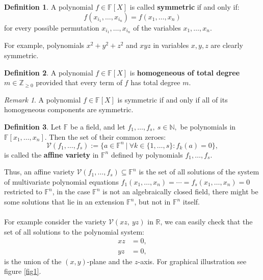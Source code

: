 \documentclass[thesis=M,english]{FITthesis}[2012/10/20]
\theoremstyle{remark}
\newtheorem*{RM}{Remark}
\theoremstyle{definition}
\newtheorem{DF}{Definition}[section]
\begin{document}
\begin{DF}
A polynomial $f \in \mathbb{F}[X]$ is called \textbf{symmetric} if and only if:
$$
f(x_{i_1}, \ldots, x_{i_n}) = f(x_1, \ldots, x_n)
$$
for every possible permutation $x_{i_1}, \ldots, x_{i_n}$ of the variables $x_1, \ldots, x_n$.
\end{DF}
\noindent For example, polynomials $x^2+y^2+z^2$ and $xyz$ in variables $x,y,z$ are clearly symmetric.
\begin{DF}
A polynomial $f \in \mathbb{F}[X]$ is \textbf{homogeneous of total degree} $m \in \mathbb{Z}_{\geq 0}$ provided that every term of $f$ has total degree $m$.
\end{DF}
\begin{RM}
A polynomial $f \in \mathbb{F}[X]$ is symmetric if and only if all of its homogeneous components are symmetric.
\end{RM}
\begin{DF}
Let $\mathbb{F}$ be a field, and let $f_1, \ldots, f_s,\ s \in \mathbb{N},$ be polynomials in $\mathbb{F}[x_1,\ldots, x_n].$ Then the set of their common zeroes:
$$
\mathcal{V}(f_1, \ldots, f_s) := \{a \in \mathbb{F}^n\ |\ \forall k \in \{1,\ldots,s\}: f_k(a) =  0\},
$$
is called the \textbf{affine variety} in $\mathbb{F}^n$ defined by polynomials $f_1, \ldots, f_s$.
\end{DF}
\noindent Thus, an affine variety $\mathcal{V}(f_1, \ldots, f_s) \subseteq \mathbb{F}^n$ is the set of all solutions of the system of multivariate polynomial equations $f_1(x_1,\ldots,x_n) = \cdots = f_s(x_1,\ldots,x_n) = 0$ restricted to $\mathbb{F}^n$, in the case $\mathbb{F}^n$ is not an algebraically closed field, there might be some solutions that lie in an extension $\mathbb{F}^n$, but not in $\mathbb{F}^n$ itself.\\ \\
\noindent For example consider the variety $\mathcal{V}(xz,\ yz)$ in $\mathbb{R}$, we can easily check that the set of all solutions to the polynomial system:
\begin{align*}
xz &= 0, \\
yz& = 0,
\end{align*}
is the union of the $(x,y)$-plane and the $z$-axis. For graphical illustration see figure \ref{fig1}.
\end{document}
